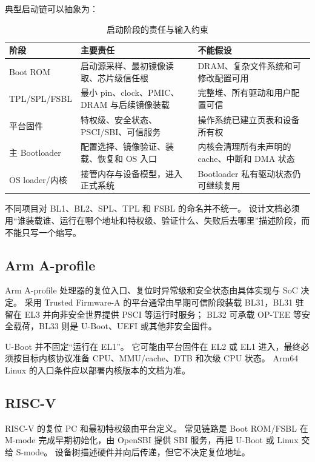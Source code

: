 典型启动链可以抽象为：

\begin{table}[H]
  \centering
  \caption{启动阶段的责任与输入约束}
  \begin{tabular}{p{27mm}p{48mm}p{62mm}}
    \hline
    阶段 & 主要责任 & 不能假设 \\
    \hline
    Boot ROM & 启动源采样、最初镜像读取、芯片级信任根 & DRAM、复杂文件系统和可修改配置可用 \\
    TPL/SPL/FSBL & 最小 pin、clock、PMIC、DRAM 与后续镜像装载 & 完整堆、所有驱动和用户配置可信 \\
    平台固件 & 特权级、安全状态、PSCI/SBI、可信服务 & 操作系统已建立页表和设备所有权 \\
    主 Bootloader & 配置选择、镜像验证、装载、恢复和 OS 入口 & 内核会清理所有未声明的 cache、中断和 DMA 状态 \\
    OS loader/内核 & 接管内存与设备模型，进入正式系统 & Bootloader 私有驱动状态仍可继续复用 \\
    \hline
  \end{tabular}
\end{table}

不同项目对 BL1、BL2、SPL、TPL 和 FSBL 的命名并不统一。
设计文档必须用“谁装载谁、运行在哪个地址和特权级、验证什么、失败后去哪里”描述阶段，而不能只写一个缩写。

\subsection{Arm A-profile}

Arm A-profile 处理器的复位入口、复位时异常级和安全状态由具体实现与 SoC 决定。
采用 Trusted Firmware-A 的平台通常由早期可信阶段装载 BL31，BL31 驻留在 EL3 并向非安全世界提供 PSCI 等运行时服务；
BL32 可承载 OP-TEE 等安全载荷，BL33 则是 U-Boot、UEFI 或其他非安全固件\cite{trusted-firmware-a-doc}。

U-Boot 并不固定“运行在 EL1”。
它可能由平台固件在 EL2 或 EL1 进入，最终必须按目标内核协议准备 CPU、MMU/cache、DTB 和次级 CPU 状态。
Arm64 Linux 的入口条件应以部署内核版本的文档为准\cite{linux-arm64-booting}。

\subsection{RISC-V}

RISC-V 的复位 PC 和最初特权级由平台定义。
常见链路是 Boot ROM/FSBL 在 M-mode 完成早期初始化，由 OpenSBI 提供 SBI 服务，再把 U-Boot 或 Linux 交给 S-mode。
设备树描述硬件并向后传递，但它不决定复位地址。


